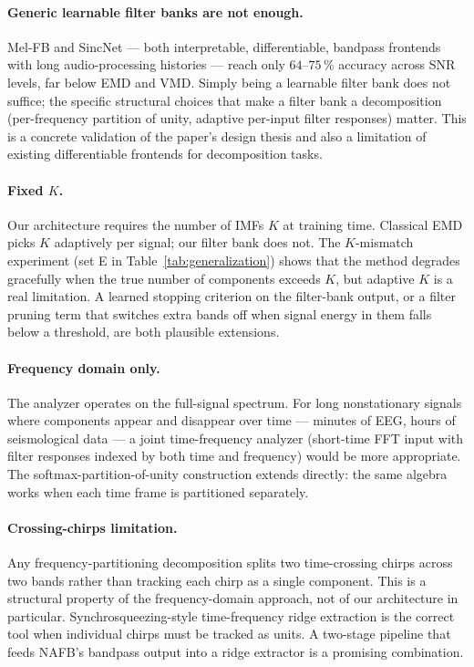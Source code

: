 \documentclass[journal]{IEEEtran}
\theoremstyle{remark}
\begin{document}
\paragraph{Generic learnable filter banks are not enough.}
Mel-FB and SincNet --- both interpretable, differentiable, bandpass
frontends with long audio-processing histories --- reach only
$64$--$75$\,\% accuracy across SNR levels, far below EMD and VMD.
Simply being a learnable filter bank does not suffice; the specific
structural choices that make a filter bank a decomposition
(per-frequency partition of unity, adaptive per-input filter
responses) matter. This is a concrete validation of the paper's
design thesis and also a limitation of existing differentiable
frontends for decomposition tasks.

\paragraph{Fixed $K$.}
Our architecture requires the number of IMFs $K$ at training time.
Classical EMD picks $K$ adaptively per signal; our filter bank does
not. The $K$-mismatch experiment (set E in
Table~\ref{tab:generalization}) shows that the method degrades
gracefully when the true number of components exceeds $K$, but
adaptive $K$ is a real limitation. A learned stopping criterion on
the filter-bank output, or a filter pruning term that switches extra
bands off when signal energy in them falls below a threshold, are
both plausible extensions.

\paragraph{Frequency domain only.}
The analyzer operates on the full-signal spectrum. For long
nonstationary signals where components appear and disappear over time
--- minutes of EEG, hours of seismological data --- a joint
time-frequency analyzer (short-time FFT input with filter responses
indexed by both time and frequency) would be more appropriate. The
softmax-partition-of-unity construction extends directly: the same
algebra works when each time frame is partitioned separately.

\paragraph{Crossing-chirps limitation.}
Any frequency-partitioning decomposition splits two time-crossing
chirps across two bands rather than tracking each chirp as a single
component. This is a structural property of the frequency-domain
approach, not of our architecture in particular. Synchrosqueezing-style
time-frequency ridge extraction is the correct tool when individual
chirps must be tracked as units. A two-stage pipeline that feeds
NAFB's bandpass output into a ridge extractor is a promising
combination.
\end{document}
